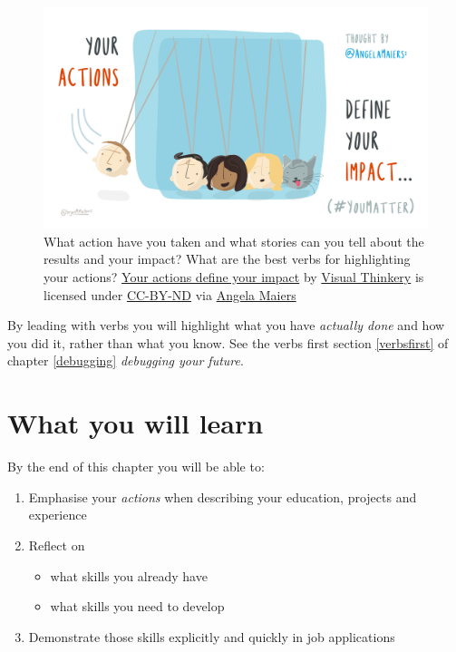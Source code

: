 \documentclass[
]{book}
\providecommand{\tightlist}{%
  \setlength{\itemsep}{0pt}\setlength{\parskip}{0pt}}
\begin{document}
\begin{figure}

{\centering \includegraphics[width=1\linewidth]{images/your-actions} 

}

\caption{What action have you taken and what stories can you tell about the results and your impact? What are the best verbs for highlighting your actions? \href{https://bryanmmathers.com/your-actions-define-your-impact/}{Your actions define your impact} by \href{https://visualthinkery.com/}{Visual Thinkery} is licensed under \href{https://creativecommons.org/licenses/by-nd/4.0/}{CC-BY-ND} via \href{https://twitter.com/AngelaMaiers}{Angela Maiers}}\label{fig:action-fig}
\end{figure}



By leading with verbs you will highlight what you have \emph{actually done} and how you did it, rather than what you know. See the verbs first section \ref{verbsfirst} of chapter \ref{debugging} \emph{debugging your future}.

\hypertarget{ilo17}{%
\section{What you will learn}\label{ilo17}}

By the end of this chapter you will be able to:

\begin{enumerate}
\def\labelenumi{\arabic{enumi}.}
\tightlist
\item
  Emphasise your \emph{actions} when describing your education, projects and experience
\item
  Reflect on

  \begin{itemize}
  \tightlist
  \item
    what skills you already have
  \item
    what skills you need to develop
  \end{itemize}
\item
  Demonstrate those skills explicitly and quickly in job applications
\end{enumerate}
\end{document}
